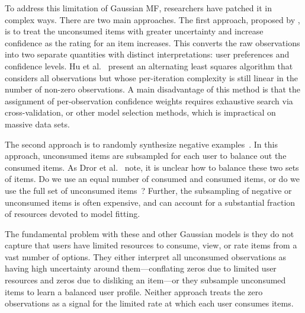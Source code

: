 To address this limitation of Gaussian MF, researchers have patched it
in complex ways. There are two main approaches. The first approach,
proposed by \cite{Hu:2008p9402}, is to treat the unconsumed items with
greater uncertainty and increase confidence as the rating for an item
increases. This converts the raw observations into two separate
quantities with distinct interpretations: user preferences and
confidence levels. Hu et al.~\cite{Hu:2008p9402} present an
alternating least squares algorithm that considers all observations
but whose per-iteration complexity is still linear in the number of
non-zero observations. A main disadvantage of this method is that the
assignment of per-observation confidence weights requires exhaustive
search via cross-validation, or other model selection methods, which
is impractical on massive data sets.

The second approach is to randomly synthesize negative
examples~\cite{Dror:2012a, Gantner:2012p9364, Paquet:2013p9197}. In
this approach, unconsumed items are subsampled for each user to
balance out the consumed items. As Dror et al.~\cite{Dror:2012a} note,
it is unclear how to balance these two sets of items. Do we use an
equal number of consumed and consumed items, or do we use the full set
of unconsumed items~\cite{Cremonesi:2010, Hu:2008p9402}?  Further, the
subsampling of negative or unconsumed items is often expensive, and
can account for a substantial fraction of resources devoted to model
fitting.

The fundamental problem with these and other Gaussian models is they
do not capture that users have limited resources to consume, view, or
rate items from a vast number of options.  They either interpret all
unconsumed observations as having high uncertainty around
them---conflating zeros due to limited user resources and zeros due to
disliking an item---or they subsample unconsumed items to learn a
balanced user profile. Neither approach treats the zero observations
as a signal for the limited rate at which each user consumes items.

